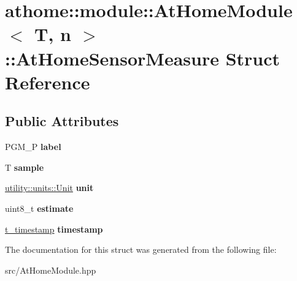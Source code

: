 \hypertarget{structathome_1_1module_1_1_at_home_module_1_1_at_home_sensor_measure}{}\section{athome\+:\+:module\+:\+:At\+Home\+Module$<$ T, n $>$\+:\+:At\+Home\+Sensor\+Measure Struct Reference}
\label{structathome_1_1module_1_1_at_home_module_1_1_at_home_sensor_measure}
\subsection*{Public Attributes}
\begin{DoxyCompactItemize}
\item 
\mbox{\label{structathome_1_1module_1_1_at_home_module_1_1_at_home_sensor_measure_a70a00407632c3969cabe019b7e3ba929}} 
P\+G\+M\+\_\+P {\bfseries label}
\item 
\mbox{\label{structathome_1_1module_1_1_at_home_module_1_1_at_home_sensor_measure_a483e0d1c0010854a57e3a1a44f2739c0}} 
T {\bfseries sample}
\item 
\mbox{\label{structathome_1_1module_1_1_at_home_module_1_1_at_home_sensor_measure_a317f5de5d9032ac12fd0504f709b2e8f}} 
\mbox{\hyperlink{structathome_1_1utility_1_1units_1_1_unit}{utility\+::units\+::\+Unit}} {\bfseries unit}
\item 
\mbox{\label{structathome_1_1module_1_1_at_home_module_1_1_at_home_sensor_measure_a3ea2587077687a8e0951e4f64730b955}} 
uint8\+\_\+t {\bfseries estimate}
\item 
\mbox{\label{structathome_1_1module_1_1_at_home_module_1_1_at_home_sensor_measure_ac8060b9a02831d05cf6598558d2314d5}} 
\mbox{\hyperlink{classathome_1_1module_1_1_at_home_module_a74611fcc9d7580bded68899a4fd9c930}{t\+\_\+timestamp}} {\bfseries timestamp}
\end{DoxyCompactItemize}


The documentation for this struct was generated from the following file\+:\begin{DoxyCompactItemize}
\item 
src/At\+Home\+Module.\+hpp\end{DoxyCompactItemize}
